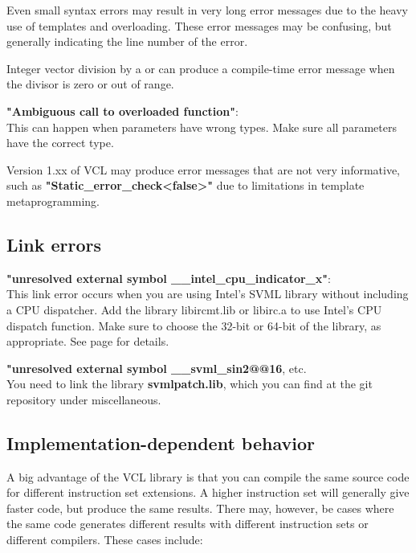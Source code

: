 \documentclass[vcl_manual.tex]{subfiles}
\begin{document}
Even small syntax errors may result in very long error messages due to the heavy use of templates and overloading. These error messages may be confusing, but generally indicating the line number of the error.

Integer vector division by a  or  can produce a compile-time error message when the divisor is zero or out of range.
 
\textbf{"Ambiguous call to overloaded function"}: \\
This can happen when parameters have wrong types.
Make sure all parameters have the correct type.

Version 1.xx of VCL may produce error messages that are not very informative, such as 
\textbf{"Static\_error\_check\textless false\textgreater"} due to limitations in template metaprogramming.


\subsection{Link errors}\label{LinkErrors}

\textbf{"unresolved external symbol \_\_intel\_cpu\_indicator\_x"}: \\
This link error occurs when you are using Intel's SVML library without including a CPU dispatcher. Add the library libircmt.lib or libirc.a to use Intel's  CPU dispatch function. Make sure to choose the 32-bit or 64-bit of the library, as appropriate. See page \pageref{ExternalMathLibrary} for details.

\textbf{"unresolved external symbol \_\_svml\_sin2@@16}, etc. \\
You need to link the library \textbf{svmlpatch.lib}, which you can find at the git repository under miscellaneous.


\subsection{Implementation-dependent behavior}\label{ImplementationDependentBehavior}

A big advantage of the VCL library is that you can compile the same source code for different instruction set extensions. A higher instruction set will generally give faster code, but produce the same results. There may, however, be cases where the same code generates different results with different instruction sets or different compilers. These cases include:
\end{document}
